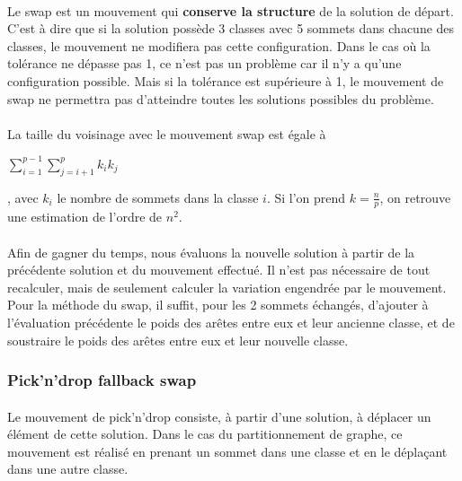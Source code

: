 \documentclass[12pt]{article}
\begin{document}
\paragraph{}Le swap est un mouvement qui \textbf{conserve la structure} de la solution de départ. C'est à dire que si la solution possède 3 classes avec 5 sommets dans chacune des classes, le mouvement ne modifiera pas cette configuration. Dans le cas où la tolérance ne dépasse pas 1, ce n'est pas un problème car il n'y a qu'une configuration possible. Mais si la tolérance est supérieure à 1, le mouvement de swap ne permettra pas d'atteindre toutes les solutions possibles du problème.

\paragraph{}La taille du voisinage avec le mouvement swap est égale à
\begin{large}$\sum\limits_{i=1}^{p-1} \sum\limits_{j=i+1}^p k_i k_j$\end{large}, avec $k_i$ le nombre de sommets dans la classe $i$. Si l'on prend $k=\frac{n}{p}$, on retrouve une estimation de l'ordre de $n^2$.

\paragraph{}Afin de gagner du temps, nous évaluons la nouvelle solution à partir de la précédente solution et du mouvement effectué. Il n'est pas nécessaire de tout recalculer, mais de seulement calculer la variation engendrée par le mouvement. Pour la méthode du swap, il suffit, pour les 2 sommets échangés, d'ajouter à l'évaluation précédente le poids des arêtes entre eux et leur ancienne classe, et de soustraire le poids des arêtes entre eux et leur nouvelle classe.

\subsubsection{Pick'n'drop fallback swap}

\paragraph{}Le mouvement de pick'n'drop consiste, à partir d'une solution, à déplacer un élément de cette solution. Dans le cas du partitionnement de graphe, ce mouvement est réalisé en prenant un sommet dans une classe et en le déplaçant dans une autre classe.
\end{document}
